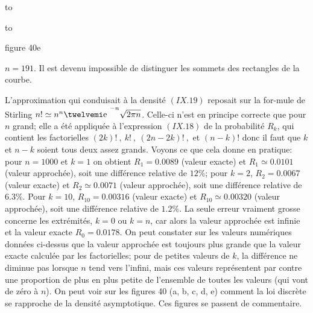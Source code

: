 \midinsert 
\vbox to  
\endinsert 
 
\midinsert 
\vbox to  
\endinsert 
 
\midinsert 
\vskip3pt
\centerline{} 
\vskip2mm 
\centerline{\eightpoint figure 40e} 
\vskip2mm 
\centerline{\vbox{\hsize=11.6cm\eightpoint \noindent $n=191$. Il est devenu  
impossible de distinguer les sommets des rectangles de la courbe. } } 
\vskip3mm 
\endinsert 

L'approximation qui conduisait \`a la densit\'e $(IX.19)$ 
reposait sur la for-mule de Stirling  $n! \simeq n^n\e^{-n}\sqrt{2\pi n}$.  
Celle-ci n'est en principe correcte que pour $n$ grand; elle a \'et\'e 
appliqu\'ee \`a l'expression $(IX.18)$ de la probabilit\'e $R_k$, qui  
contient les factorielles $(2k)!\ ,\ k!\ ,\ (2n-2k)!\ ,$ et $(n-k)!$ donc il 
faut que $k$ et $n-k$ soient tous deux assez grands. Voyons ce que cela 
donne en pratique: pour $n=1000$ et $k=1$ on obtient $R_1=0.0089$ 
(valeur exacte) et $R_1\simeq 0.0101$ (valeur approch\'ee),  soit une  
diff\'erence relative de $12\%$;  pour $k=2$,  $R_2=0.0067$ (valeur 
exacte) et $R_2\simeq 0.0071$ (valeur approch\'ee),  soit une  
diff\'erence relative  de $6.3\%$.  Pour $k=10$,  $R_{10}=0.00316$ 
(valeur exacte) et $R_{10}\simeq 0.00320$ (valeur approch\'ee),  soit  
une diff\'erence relative de $1.2\%$.  La seule erreur vraiment grosse 
concerne les extr\'emit\'es,  $k=0$ ou $k=n$,  car alors la valeur 
approch\'ee est infinie et la valeur exacte $R_0=0.0178$.  On peut 
constater sur les valeurs num\'eriques donn\'ees ci-dessus que la valeur 
approch\'ee est toujours plus grande que la valeur exacte calcul\'ee par 
les factorielles;  pour de petites valeurs de $k$,  la diff\'erence ne  
diminue pas lorsque $n$ tend vers l'infini,  mais ces valeurs  
repr\'esentent par contre une proportion de plus en plus petite de 
l'ensemble de toutes les valeurs (qui vont de z\'ero \`a $n$). 
\medskip  
On peut voir sur les figures 40 (a, b, c, d, e) comment 
la loi discr\`ete se rapproche de la densit\'e asymptotique.  Ces figures 
se passent de commentaire. 
 
